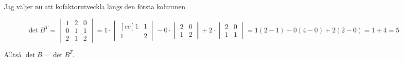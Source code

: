 \documentclass[../../main.tex]{subfiles}
\begin{document}
\begin{solution}{11}
Jag väljer nu att kofaktorutveckla längs den första kolumnen

$$
\det B^T = \begin{vmatrix}
1&2&0\\
0&1&1\\
2&1&2
\end{vmatrix}
= 1\cdot \begin{vmatrix}[cc]
1& 1\\ 
1&2
\end{vmatrix}
- 0\cdot \begin{vmatrix}
2 & 0\\
1 & 2
\end{vmatrix}
+ 2\cdot \begin{vmatrix}
2&0\\
1&1
\end{vmatrix}
= 1(2-1) - 0(4-0) + 2(2 - 0) = 1 + 4 = 5
$$

Alltså $\det B = \det B^T$. 

\end{solution}
\end{document}
